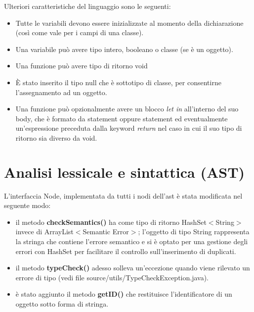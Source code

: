 \documentclass[a4paper]{article}   %
\begin{document}
Ulteriori caratteristiche del linguaggio sono le seguenti:\\
\begin{itemize}
  \item Tutte le variabili devono essere inizializzate al momento della dichiarazione (così come vale
 per i campi di una classe).
  \item Una variabile può avere tipo intero, booleano o classe (se è un oggetto).
  \item Una funzione può avere tipo di ritorno void
  \item È stato inserito il tipo null che è sottotipo di classe, per consentirne l'assegnamento ad un oggetto.
  \item Una funzione può opzionalmente avere un blocco \textit{let in} all'interno del suo body, che è formato da
  statement oppure statement ed eventualmente un'espressione preceduta dalla keyword \textit{return} nel caso in
  cui il suo tipo di ritorno sia diverso da void.
\end{itemize}

\section{Analisi lessicale e sintattica (AST)}
L'interfaccia Node, implementata da tutti i nodi dell'ast è stata modificata nel seguente modo:\\
\begin{itemize}
  \item il metodo \textbf{checkSemantics()} ha come tipo di ritorno HashSet$<$String$>$ invece di ArrayList$<$Semantic Error$>$;
  l'oggetto di tipo String rappresenta la stringa che contiene l'errore semantico e si è
  optato per una gestione degli errori con HashSet per facilitare il controllo sull'inserimento
  di duplicati.
  \item il metodo \textbf{typeCheck()} adesso solleva un'eccezione quando viene rilevato un errore di tipo
  (vedi file source/utils/TypeCheckException.java).
  \item è stato aggiunto il metodo \textbf{getID()} che restituisce l'identificatore di un oggetto sotto forma di stringa.
\end{itemize}


\end{document}
